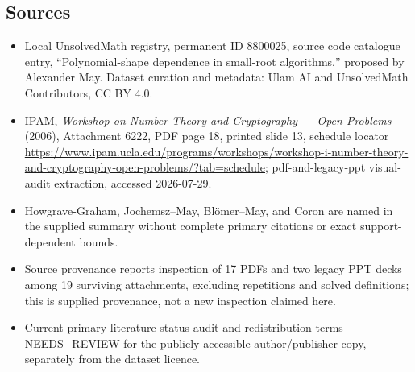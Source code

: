\documentclass[11pt]{article}
\begin{document}
\subsection{Sources}
\begin{itemize}
\item Local UnsolvedMath registry, permanent ID 8800025, source code catalogue entry, ``Polynomial-shape dependence in small-root algorithms,'' proposed by Alexander May. Dataset curation and metadata: Ulam AI and UnsolvedMath Contributors, CC BY 4.0.
\item IPAM, \emph{Workshop on Number Theory and Cryptography --- Open Problems} (2006), Attachment 6222, PDF page 18, printed slide 13, schedule locator \url{https://www.ipam.ucla.edu/programs/workshops/workshop-i-number-theory-and-cryptography-open-problems/?tab=schedule}; pdf-and-legacy-ppt visual-audit extraction, accessed 2026-07-29.
\item Howgrave-Graham, Jochemsz--May, Blömer--May, and Coron are named in the supplied summary without complete primary citations or exact support-dependent bounds.
\item Source provenance reports inspection of 17 PDFs and two legacy PPT decks among 19 surviving attachments, excluding repetitions and solved definitions; this is supplied provenance, not a new inspection claimed here.
\item Current primary-literature status audit and redistribution terms NEEDS\_REVIEW for the publicly accessible author/publisher copy, separately from the dataset licence.
\end{itemize}
\end{document}
